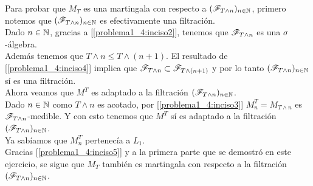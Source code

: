 	Para probar que $M_T$ es una martingala con respecto a $(\mathscr{F}_{T \wedge n})_{n \in \mathbb{N}}$, primero notemos que
	$(\mathscr{F}_{T \wedge n})_{n \in \mathbb{N}}$ es efectivamente una filtración.\\
	
	Dado $n \in \mathbb{N}$, gracias a [\ref{problema1_4:inciso2}], tenemos que $\mathscr{F}_{T \wedge n}$ es una $\sigma$-álgebra.\\

	Además tenemos que $T \wedge n \leq T \wedge (n+1)$. El resultado de [\ref{problema1_4:inciso4}] implica que 
	$\mathscr{F}_{T \wedge n} \subset \mathscr{F}_{T \wedge (n+1)}$ y por lo tanto $(\mathscr{F}_{T \wedge n})_{n \in \mathbb{N}}$ sí es una filtración.\\
	
	Ahora veamos que $M^T$ es adaptado a la filtración $(\mathscr{F}_{T \wedge n})_{n \in \mathbb{N}}$.\\

	Dado $n \in \mathbb{N}$ como $T \wedge n$ es acotado, por [\ref{problema1_4:inciso3}] $M_n^T = M_{T \wedge n}$ es $\mathscr{F}_{T \wedge n}$-medible.
	Y con esto tenemos que $M^T$ sí es adaptado a la filtración $(\mathscr{F}_{T \wedge n})_{n \in \mathbb{N}}$.\\
	
	Ya sabíamos que $M_n^T$ pertenecía a $L_1$.\\
	
	Gracias [\ref{problema1_4:inciso5}] y a la primera parte que se demostró en este ejercicio, se sigue que $M_T$ también es
	martingala con respecto a la filtración $(\mathscr{F}_{T \wedge n})_{n \in \mathbb{N}}$.\\